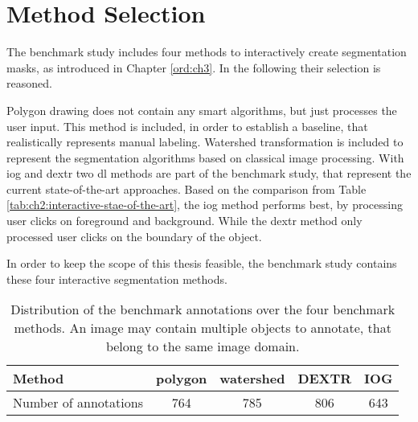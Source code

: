 
\section{Method Selection}\label{ord:ch4:sec2}

The benchmark study includes four methods to interactively create segmentation masks, as introduced in Chapter \ref{ord:ch3}. 
In the following their selection is reasoned.

Polygon drawing does not contain any smart algorithms, but just processes the user input.
This method is included, in order to establish a baseline, that realistically represents manual labeling.
Watershed transformation is included to represent the segmentation algorithms based on classical image processing.
With \gls{iog} and \gls{dextr} two \gls{dl} methods are part of the benchmark study, that represent the current state-of-the-art approaches.
Based on the comparison from Table \ref{tab:ch2:interactive-stae-of-the-art}, the \gls{iog} method performs best, by processing user clicks on foreground and background.
While the \gls{dextr} method only processed user clicks on the boundary of the object.

In order to keep the scope of this thesis feasible, the benchmark study contains these four interactive segmentation methods.

\begin{table}[h!]
	\centering
	\begin{tabular}{l|c c c c}
		Method					& polygon 	& watershed & DEXTR & IOG 	\\
		\hline
		Number of annotations 	& 764 		&  	785		& 806 	& 643 	\\
	\end{tabular}
	\caption[Overview of benchmark methods]{
		Distribution of the benchmark annotations over the four benchmark methods.
		An image may contain multiple objects to annotate, that belong to the same image domain.
	} \label{tab:ch4:methods_overview}
\end{table}
